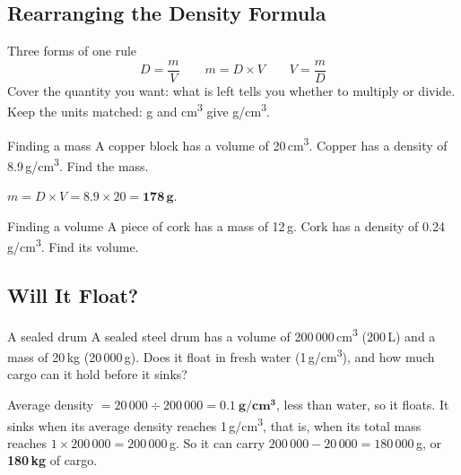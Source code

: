 \rcreset
{}

\label{theory:6}

\subsection{Rearranging the Density Formula}\label{sub:a6.1}

\begin{skillbox}{Three forms of one rule}
\[ D = \frac{m}{V} \qquad m = D \times V \qquad V = \frac{m}{D} \]
Cover the quantity you want: what is left tells you whether to multiply or divide. Keep the units matched: g and cm\textsuperscript{3} give g/cm\textsuperscript{3}.
\end{skillbox}

\begin{workedex}{Finding a mass}
A copper block has a volume of 20\,cm\textsuperscript{3}. Copper has a density of 8.9\,g/cm\textsuperscript{3}. Find the mass.

\smallskip
$m = D \times V = 8.9 \times 20 = \mathbf{178\,g}$.
\end{workedex}

\begin{wedo}{Finding a volume}
A piece of cork has a mass of 12\,g. Cork has a density of 0.24\,g/cm\textsuperscript{3}. Find its volume.
\workbox{4cm}
\end{wedo}

\subsection{Will It Float?}\label{sub:a6.2}

\begin{workedex}{A sealed drum}
A sealed steel drum has a volume of 200\,000\,cm\textsuperscript{3} (200\,L) and a mass of 20\,kg (20\,000\,g). Does it float in fresh water (1\,g/cm\textsuperscript{3}), and how much cargo can it hold before it sinks?

\smallskip
Average density $= 20\,000 \div 200\,000 = \mathbf{0.1\ g/cm^3}$, less than water, so it floats.
It sinks when its average density reaches 1\,g/cm\textsuperscript{3}, that is, when its total mass reaches $1 \times 200\,000 = 200\,000$\,g. So it can carry $200\,000 - 20\,000 = 180\,000$\,g, or \textbf{180\,kg} of cargo.
\end{workedex}

